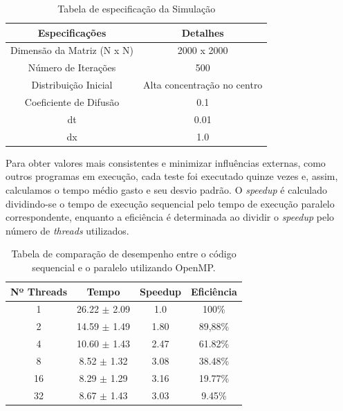 \documentclass[12pt]{article}
\begin{document}
\begin{table}[ht]
  \centering
  \caption{Tabela de especificação da Simulação}
  \vspace{0.3cm}
  \begin{tabular}{||c c||}
    \hline
    Especificações             & Detalhes                    \\ [0.5ex]
    \hline\hline
    Dimensão da Matriz (N x N) & 2000 x 2000                 \\
    \hline
    Número de Iterações        & 500                         \\
    \hline
    Distribuição Inicial       & Alta concentração no centro \\
    \hline
    Coeficiente de Difusão     & 0.1                         \\
    \hline
    dt                         & 0.01                        \\
    \hline
    dx                         & 1.0                         \\
    \hline
  \end{tabular}
\end{table}

Para obter valores mais consistentes e minimizar influências externas, como
outros programas em execução, cada teste foi executado quinze vezes e, assim,
calculamos o tempo médio gasto e seu desvio padrão. O \textit{speedup} é
calculado dividindo-se o tempo de execução sequencial pelo tempo de execução
paralelo correspondente, enquanto a eficiência é determinada ao dividir o
\textit{speedup} pelo número de \textit{threads} utilizados.

\begin{table}[ht]
  \centering
  \caption{Tabela de comparação de desempenho entre o código sequencial e o
    paralelo utilizando OpenMP.}
  \vspace{0.3cm}
  \begin{tabular}{||c c c c||}
    \hline
    Nº Threads & Tempo            & Speedup & Eficiência \\ [0.5ex]
    \hline\hline
    1          & 26.22 $\pm$ 2.09 & 1.0     & 100\%      \\
    \hline
    2          & 14.59 $\pm$ 1.49 & 1.80    & 89,88\%    \\
    \hline
    4          & 10.60 $\pm$ 1.43 & 2.47    & 61.82\%    \\
    \hline
    8          & 8.52 $\pm$ 1.32  & 3.08    & 38.48\%    \\
    \hline
    16         & 8.29 $\pm$ 1.29  & 3.16    & 19.77\%    \\
    \hline
    32         & 8.67 $\pm$ 1.43  & 3.03    & 9.45\%     \\
    \hline
  \end{tabular}
\end{table}
\end{document}

